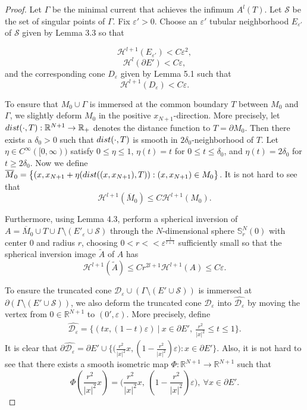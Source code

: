 \documentclass[10pt,a4paper]{amsart}
\newcommand{\R}{\mathbb{R}}
\begin{document}
\begin{proof} Let $\Gamma$ be the minimal current that achieves the infimum $A^l(T)$. Let $\mathcal{S}$ be the set of singular points of $\Gamma$.
Fix $\varepsilon'>0$. Choose an $\varepsilon'$ tubular neighborhood $E_{\varepsilon'}$ of $\mathcal{S}$ given by Lemma 3.3 so that

\[\mathcal{H}^{l+1}(E_{\varepsilon'})<C \varepsilon^2,\]  
\[\mathcal{H}^{l}(\partial E')<C \varepsilon,\]
and the corresponding cone $D_\varepsilon$ given by Lemma 5.1 such that \[\mathcal{H}^{l+1}(D_\varepsilon)<C\varepsilon.\]

{To ensure that $M_0\cup \Gamma$ is immersed at the common boundary $T$ between $M_0$ and $\Gamma$, we slightly deform $M_0$ in the positive $x_{N+1}$-direction.
More precisely, let ${\rm{dist}}(\cdot, T):\R^{N+1}\to\R_+$ denotes the distance function to $T=\partial M_0$. Then there exists a $\delta_0>0$ such that 
${\rm{dist}}(\cdot, T)$ is smooth in $2\delta_0$-neighborhood
of $T$. Let $\eta\in C^\infty([0,\infty))$ satisfy $0\le\eta\le 1$, $\eta(t)=t$ for $0\le t\le \delta_0$, and $\eta(t)=2\delta_0$ for $t\ge 2\delta_0$.  Now we define
$\overline{M}_0=\big\{(x, x_{N+1}+\eta({\rm{dist}}((x, x_{N+1}),T)): (x, x_{N+1})\in M_0\big\}$. It is not hard to see that 
$$\mathcal{H}^{l+1}(\overline{M}_0)\le C\mathcal{H}^{l+1}(M_0).$$}

Furthermore, using Lemma 4.3, perform a spherical inversion of $A = \overline{M}_0 \cup T\cup \Gamma \setminus (E'_\varepsilon \cup \mathcal{S})$ through 
{the $N$-dimensional sphere $\mathbb{S}^N_r(0)$ with center $0$ and radius $r$}, choosing {$0<r<< \varepsilon^{\frac{1}{l+1}}$ 
sufficiently small  so that }the spherical inversion image $\widetilde{A}$ of $A$
has 
\[\mathcal{H}^{l+1}(\widetilde{A})\le C r^{2l+1} \mathcal{H}^{l+1}(A)\le C \varepsilon.\]

\smallskip
{To ensure the truncated cone $\mathcal{D}_\varepsilon \cup (\Gamma\setminus(E'\cup\mathcal{S}))$ is immersed at $\partial(\Gamma\setminus(E'\cup\mathcal{S}))$,
we also deform the truncated cone $\mathcal{D}_\varepsilon$ into $\widehat{\mathcal{D}_\varepsilon}$ 
by moving the vertex from $0\in\R^{N+1}$ to $(0',\varepsilon)$. More precisely, define 
\begin{align*}
\widehat{\mathcal{D}_\varepsilon}=\Big\{(tx, (1-t)\varepsilon)\ \big|\ x\in \partial E', \ \frac{r^2}{|x|^2} \le t\le 1\Big\}.
\end{align*}
It is clear that $\partial \widehat{\mathcal{D}_\varepsilon}=\partial E'\cup \big\{\big(\frac{r^2}{|x|^2} x, (1-\frac{r^2}{|x|^2})\varepsilon\big): x\in\partial E'\big\}$.
Also, it is not hard to see that there exists a smooth isometric map $\Phi:\mathbb R^{N+1}\to \mathbb R^{N+1}$ such that 
$$\Phi(\frac{r^2}{|x|^2} x)= \Big(\frac{r^2}{|x|^2} x, \ (1-\frac{r^2}{|x|^2})\varepsilon\Big), \ \forall x\in \partial E'.$$

}
\end{proof}
\end{document}
